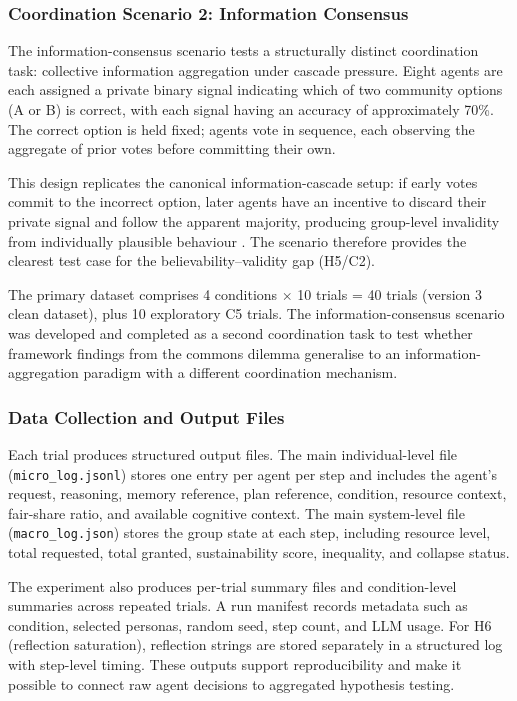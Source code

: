 \documentclass[11pt]{article}
\begin{document}
\subsubsection{Coordination Scenario 2: Information Consensus}
The information-consensus scenario tests a structurally distinct coordination task: collective information aggregation under cascade pressure. Eight agents are each assigned a private binary signal indicating which of two community options (A or B) is correct, with each signal having an accuracy of approximately 70\%. The correct option is held fixed; agents vote in sequence, each observing the aggregate of prior votes before committing their own.

This design replicates the canonical information-cascade setup: if early votes commit to the incorrect option, later agents have an incentive to discard their private signal and follow the apparent majority, producing group-level invalidity from individually plausible behaviour \cite{bikhchandani1992theory}. The scenario therefore provides the clearest test case for the believability--validity gap (H5/C2).

The primary dataset comprises 4 conditions $\times$ 10 trials = 40 trials (version 3 clean dataset), plus 10 exploratory C5 trials. The information-consensus scenario was developed and completed as a second coordination task to test whether framework findings from the commons dilemma generalise to an information-aggregation paradigm with a different coordination mechanism.

\subsubsection{Data Collection and Output Files}
Each trial produces structured output files. The main individual-level file (\texttt{micro\_log.jsonl}) stores one entry per agent per step and includes the agent's request, reasoning, memory reference, plan reference, condition, resource context, fair-share ratio, and available cognitive context. The main system-level file (\texttt{macro\_log.json}) stores the group state at each step, including resource level, total requested, total granted, sustainability score, inequality, and collapse status.

The experiment also produces per-trial summary files and condition-level summaries across repeated trials. A run manifest records metadata such as condition, selected personas, random seed, step count, and LLM usage. For H6 (reflection saturation), reflection strings are stored separately in a structured log with step-level timing. These outputs support reproducibility and make it possible to connect raw agent decisions to aggregated hypothesis testing.
\end{document}
